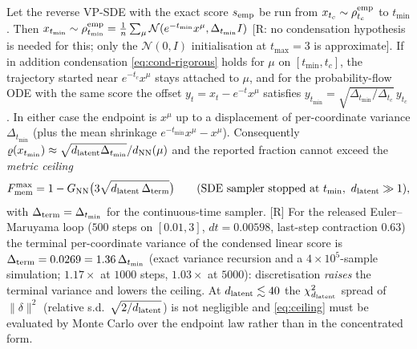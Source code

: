 \begin{lemma}\label{lem:endpoint}
Let the reverse VP-SDE with the exact score $s_{\rm emp}$ be run from $x_{t_c}\sim\rho^{\rm emp}_{t_c}$ to $t_{\min}$. Then $x_{t_{\min}}\sim\rho^{\rm emp}_{t_{\min}}=\frac1{n}\sum_\mu\mathcal N(e^{-t_{\min}}x^\mu,\Delta_{t_{\min}}I)$ [R: no condensation hypothesis is needed for this; only the $\mathcal N(0,I)$ initialisation at $t_{\max}=3$ is approximate]. If in addition condensation \eqref{eq:cond-rigorous} holds for $\mu$ on $[t_{\min},t_c]$, the trajectory started near $e^{-t_c}x^\mu$ stays attached to $\mu$, and for the probability-flow ODE with the same score the offset $y_t=x_t-e^{-t}x^\mu$ satisfies $y_{t_{\min}}=\sqrt{\Delta_{t_{\min}}/\Delta_{t_c}}\,y_{t_c}$. In either case the endpoint is $x^\mu$ up to a displacement of per-coordinate variance $\Delta_{t_{\min}}$ (plus the mean shrinkage $e^{-t_{\min}}x^\mu-x^\mu$). Consequently $\varrho(x_{t_{\min}})\approx\sqrt{d_{\mathrm{latent}}\Delta_{t_{\min}}}/d_{\rm NN}(\mu)$ and the reported fraction cannot exceed the \emph{metric ceiling}
\begin{equation}\label{eq:ceiling}
 F^{\max}_{\rm mem}=1-G_{\rm NN}\big(3\sqrt{\dlat\,\Delta_{\rm term}}\big)\qquad(\text{SDE sampler stopped at }t_{\min},\ \dlat\gg1),
\end{equation}
with $\Delta_{\rm term}=\Delta_{t_{\min}}$ for the continuous-time sampler. [R] For the released Euler--Maruyama loop ($500$ steps on $[0.01,3]$, $dt=0.00598$, last-step contraction $0.63$) the terminal per-coordinate variance of the condensed linear score is $\Delta_{\rm term}=0.0269=1.36\,\Delta_{t_{\min}}$ (exact variance recursion and a $4\times10^5$-sample simulation; $1.17\times$ at $1000$ steps, $1.03\times$ at $5000$): discretisation \emph{raises} the terminal variance and lowers the ceiling. At $d_{\mathrm{latent}}\lesssim40$ the $\chi^2_{d_{\mathrm{latent}}}$ spread of $\|\delta\|^2$ (relative s.d.\ $\sqrt{2/d_{\mathrm{latent}}}$) is not negligible and \eqref{eq:ceiling} must be evaluated by Monte Carlo over the endpoint law rather than in the concentrated form.
\end{lemma}
